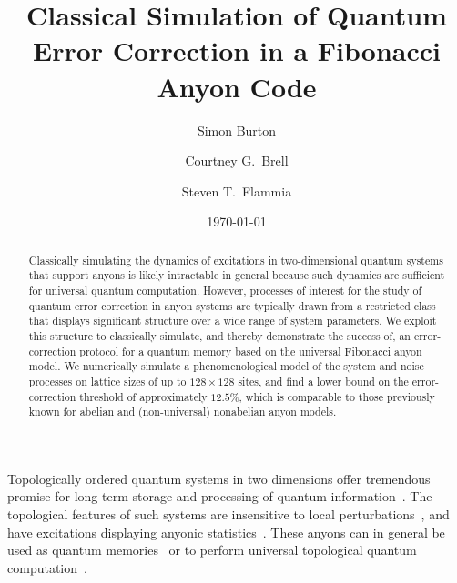 \documentclass[aps, prl, letterpaper, twocolumn, superscriptaddress, notitlepage, 10pt]{revtex4-1}
\begin{document}
\title{Classical Simulation of Quantum Error Correction in a Fibonacci Anyon Code}

\author{Simon Burton}
\author{Courtney G.\ Brell}
\author{Steven T.\ Flammia}

\date{\today}

\begin{abstract}
Classically simulating the dynamics of excitations in two-dimensional quantum systems that 
support anyons is likely intractable in general because such dynamics are sufficient for 
universal quantum computation. However, processes of interest for the study of quantum 
error correction in anyon systems are typically drawn from a restricted class that displays 
significant structure over a wide range of system parameters.
We exploit this structure to classically simulate, and thereby demonstrate the success of, an 
error-correction protocol for a quantum memory based on the universal Fibonacci anyon 
model.  We numerically simulate a phenomenological model of the system and noise 
processes on lattice sizes of up to 
$128\times128$ sites, and find a lower bound on the error-correction threshold of 
approximately $12.5\%$, which is comparable to those previously known for abelian and 
(non-universal) nonabelian anyon models.
\end{abstract}

\maketitle


Topologically ordered quantum systems in two dimensions offer tremendous promise for 
long-term storage and processing of quantum information~\cite{Kitaev2003, Dennis2002, Nayak2008}. 
The topological features of such systems are insensitive to local 
perturbations~\cite{Bravyi2010, *Bravyi2011a, *Michalakis2013}, and have excitations 
displaying anyonic statistics~\cite{Wilczek1990}. These anyons can in general be used as 
quantum memories~\cite{Kitaev2003, Dennis2002} or to perform universal topological 
quantum computation~\cite{Freedman2002, Nayak2008}.
\end{document}
